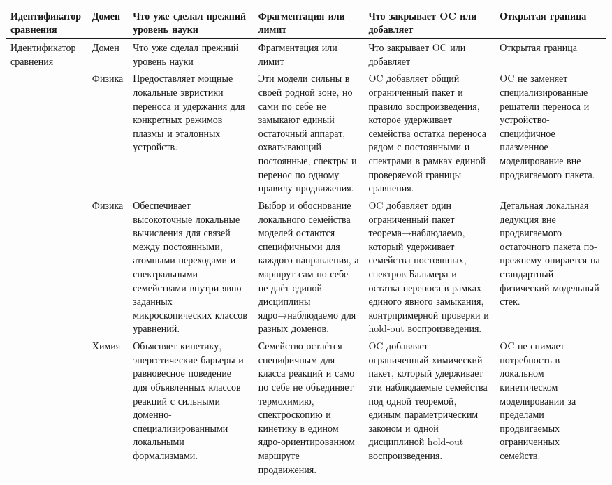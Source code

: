 \begin{longtable}{@{}L{0.17\textwidth}L{0.09\textwidth}L{0.17\textwidth}L{0.17\textwidth}L{0.20\textwidth}L{0.14\textwidth}@{}}
\toprule
Идентификатор сравнения & Домен & Что уже сделал прежний уровень науки & Фрагментация или лимит & Что закрывает OC или добавляет & Открытая граница \\
\midrule
\endfirsthead
\toprule
Идентификатор сравнения & Домен & Что уже сделал прежний уровень науки & Фрагментация или лимит & Что закрывает OC или добавляет & Открытая граница \\
\midrule
\endhead
{} & Физика & Предоставляет мощные локальные эвристики переноса и удержания для конкретных режимов плазмы и эталонных устройств. & Эти модели сильны в своей родной зоне, но сами по себе не замыкают единый остаточный аппарат, охватывающий постоянные, спектры и перенос по одному правилу продвижения. & OC добавляет общий ограниченный пакет и правило воспроизведения, которое удерживает семейства остатка переноса рядом с постоянными и спектрами в рамках единой проверяемой границы сравнения. & OC не заменяет специализированные решатели переноса и устройство-специфичное плазменное моделирование вне продвигаемого пакета. \\
 & Физика & Обеспечивает высокоточные локальные вычисления для связей между постоянными, атомными переходами и спектральными семействами внутри явно заданных микроскопических классов уравнений. & Выбор и обоснование локального семейства моделей остаются специфичными для каждого направления, а маршрут сам по себе не даёт единой дисциплины ядро→наблюдаемо для разных доменов. & OC добавляет один ограниченный пакет теорема→наблюдаемо, который удерживает семейства постоянных, спектров Бальмера и остатка переноса в рамках единого явного замыкания, контрпримерной проверки и hold-out воспроизведения. & Детальная локальная дедукция вне продвигаемого остаточного пакета по-прежнему опирается на стандартный физический модельный стек. \\
 & Химия & Объясняет кинетику, энергетические барьеры и равновесное поведение для объявленных классов реакций с сильными доменно-специализированными локальными формализмами. & Семейство остаётся специфичным для класса реакций и само по себе не объединяет термохимию, спектроскопию и кинетику в едином ядро-ориентированном маршруте продвижения. & OC добавляет ограниченный химический пакет, который удерживает эти наблюдаемые семейства под одной теоремой, единым параметрическим законом и одной дисциплиной hold-out воспроизведения. & OC не снимает потребность в локальном кинетическом моделировании за пределами продвигаемых ограниченных семейств. \\

\end{longtable}
